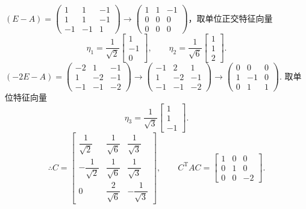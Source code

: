 \documentclass[a4paper,11pt]{ctexart}
\newcommand{\T}{\mathrm{T}}
\begin{document}
$(E - A) = \begin{pmatrix} 1 & 1 & -1 \\ 1 & 1 & -1 \\ -1 & -1 & 1 \end{pmatrix} \to \begin{pmatrix} 1 & 1 & -1 \\ 0 & 0 & 0 \\ 0 & 0 & 0 \end{pmatrix}$，取单位正交特征向量
\[
  \eta_1 = \frac{1}{\sqrt{2}} \begin{bmatrix} 1 \\ -1 \\ 0 \end{bmatrix},\qquad
  \eta_2 = \frac{1}{\sqrt{6}} \begin{bmatrix} 1 \\ 1 \\ 2 \end{bmatrix}.
\]
$(-2E - A) = \begin{pmatrix} -2 & 1 & -1 \\ 1 & -2 & -1 \\ -1 & -1 & -2 \end{pmatrix} \to \begin{pmatrix} -1 & 2 & 1 \\ 1 & -2 & -1 \\ -1 & -1 & -2 \end{pmatrix} \to \begin{pmatrix} 0 & 0 & 0 \\ 1 & -1 & 0 \\ 0 & 1 & 1 \end{pmatrix}$. 取单位特征向量
\[
  \eta_3 = \frac{1}{\sqrt{3}} \begin{bmatrix} 1 \\ 1 \\ -1 \end{bmatrix}.
\]
\[
  \therefore C = \begin{bmatrix}
    \dfrac{1}{\sqrt{2}} & \dfrac{1}{\sqrt{6}} & \dfrac{1}{\sqrt{3}} \\[0.8em]
    -\dfrac{1}{\sqrt{2}} & \dfrac{1}{\sqrt{6}} & \dfrac{1}{\sqrt{3}} \\[0.8em]
    0 & \dfrac{2}{\sqrt{6}} & -\dfrac{1}{\sqrt{3}}
  \end{bmatrix},\qquad
  C^{\T} A C = \begin{bmatrix}
    1 & 0 & 0 \\
    0 & 1 & 0 \\
    0 & 0 & -2
  \end{bmatrix}.
\]
\end{document}
